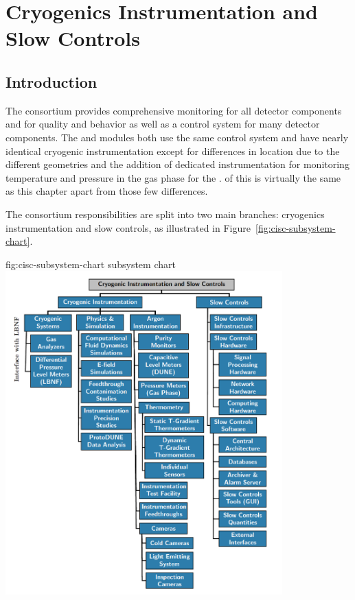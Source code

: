 \chapter{Cryogenics Instrumentation and Slow Controls}
\label{ch:sp-cisc}


\section{Introduction} 

The  consortium provides comprehensive monitoring for all detector  components and for  quality and behavior as well as a control system for many detector components.
The  and  modules both use the same control
system and have nearly identical cryogenic instrumentation except
for differences in location due to the different 
geometries and the addition of dedicated instrumentation for
monitoring temperature and pressure in the gas phase for the
.  \dpchcisc %
of this
 is virtually the same as this chapter apart from
those few differences.


The consortium responsibilities are split into 
two main branches: cryogenics instrumentation and slow controls, as illustrated in  Figure~\ref{fig:cisc-subsystem-chart}. %

\begin{dunefigure}{fig:cisc-subsystem-chart}
  { subsystem chart}
  \includegraphics[width=0.8\textwidth]{graphics/CISC_scope_SP_2019Apr15.png}
\end{dunefigure}

